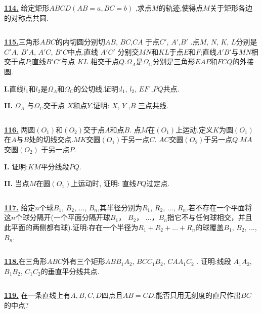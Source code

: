 \documentclass{article}
\begin{document}
$$ $$


\href{http://www.artofproblemsolving.com/Forum/viewtopic.php?p=133409#p133409
 }{\bf 114.} 给定矩形$ABCD  (AB=a,BC=b)$ ,求点$M$的轨迹,使得点$M$关于矩形各边的对称点共圆.


$$ $$


\href{http://www.artofproblemsolving.com/Forum/viewtopic.php?p=136311#p136311
 }{\bf 115.}三角形$ABC$的内切圆分别切$AB$, $BC$,$CA$ 于点$C'$, $A'$,$B'$ .点$M$, $N$, $K$, $L$分别是$C'A$, $B'A$, $A'C$, $B'C$中点.直线 $A'C'$ 分别交$MN$和$KL$于点$E$和$F$;直线$A'B'$与$MN$相交于点$P$;直线$B'C'$与点 $KL$ 相交于点$Q$.$\Omega_A$是$\Omega_C$分别是三角形$EAP$和$FCQ$的外接圆.
 
{\bf I.}直线$l_1$和$l_2$是$\Omega_A$和$\Omega_C$的公切线.证明:$l_1$, $l_2$, $EF$ ,$PQ$共点.

{\bf II.} $\Omega_A$ 与$\Omega_C$交于点 $X$和点$Y$.证明: $X$, $Y$ ,$B$ 三点共线.

$$ $$

\href{http://www.artofproblemsolving.com/Forum/viewtopic.php?p=138570#p138570
 }{\bf 116.} 两圆$\left(O_1\right)$和$\left(O_2\right)$交于点$A$和点$B$. 点$M$在$\left(O_1\right)$上运动.定义$K$为圆$\left(O_1\right)$在$A$与$B$处的切线交点.$MK$交圆$\left(O_1\right)$于另一点$C$. $AC$交圆$\left(O_2\right)$于另一点$Q$.$MA$交圆$\left(O_2\right)$ 于另一点$P$.
 
{\bf I.} 证明:$KM$平分线段$PQ$.

{\bf II.} 当点$M$在圆$\left(O_1\right)$上运动时, 证明: 直线$PQ$过定点.


$$ $$


\href{ http://www.artofproblemsolving.com/Forum/viewtopic.php?p=112682#p112682
}{\bf 117.} 给定$n$个球$B_1$, $B_2$, ..., $B_n$,其半径分别为$R_1$, $R_2$, ..., $R_n$.若不存在一个平面将这$n$个球分隔开(一个平面分隔开球$ B_1 $， $ B_2 $， ...，$ B_n $指它不与任何球相交，并且此平面的两侧都有球).证明:存在一个半径为$R_1+R_2+...+R_n$的球覆盖$B_1$, $B_2$, ..., $B_n$.


$$ $$


\href{ http://www.artofproblemsolving.com/Forum/viewtopic.php?p=143442#p143442
}{\bf 118.}在三角形$ABC$外有三个矩形$ABB_1A_2$, $BCC_1B_2$, $CAA_1C_2$ . 证明:线段 $A_1A_2$, $B_1B_2$, $C_1C_2$的垂直平分线共点.


$$ $$


\href{ http://www.artofproblemsolving.com/Forum/viewtopic.php?p=112052#p112052
}{\bf 119.} 在一条直线上有$A,B,C,D$四点且$AB=CD$.能否只用无刻度的直尺作出$BC$ 的中点?
\end{document}
